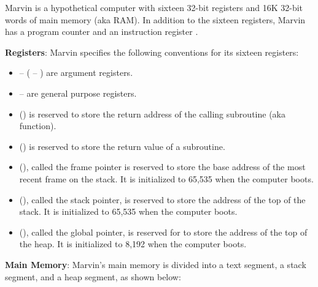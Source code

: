 \documentclass{article}
\begin{document}
\noindent Marvin is a hypothetical computer with sixteen 32-bit registers and 16K 32-bit words of main memory (aka RAM). In addition to the sixteen registers, Marvin has a program counter  and an instruction register . 

\bigskip

\noindent \textbf{Registers}: Marvin specifies the following conventions for its sixteen registers:
\begin{itemize}
\item {} --  ( -- ) are argument registers.
\item {} --  are general purpose registers.
\item {} () is reserved to store the return address of the calling subroutine (aka function).
\item {} () is reserved to store the return value of a subroutine.
\item {} (), called the frame pointer is reserved to store the base address of the most recent frame on the stack. It is initialized to 65,535 when the computer boots.
\item {} (), called the stack pointer, is reserved to store the address of the top of the stack. It is initialized to 65,535 when the computer boots.
\item {} (), called the global pointer, is reserved for to store the address of the top of the heap. It is initialized to 8,192 when the computer boots.
\end{itemize}

\bigskip

\noindent \textbf{Main Memory}: Marvin's main memory is divided into a text segment, a stack segment, and a heap segment, as shown below:

\smallskip

\begin{center}
\end{center}
\end{document}
